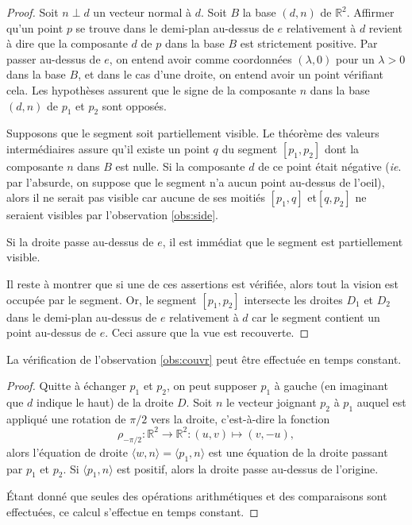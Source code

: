 \begin{proof}
  Soit $n\perp d$ un vecteur normal à $d$. Soit $B$ la base $(d, n)$
  de $\mathbb R^2$. Affirmer qu'un point $p$ se trouve
  dans le demi-plan au-dessus de $e$ relativement à $d$ revient à dire
  que la composante $d$ de $p$ dans la base $B$ est strictement
  positive. Par passer au-dessus de $e$, on entend avoir comme coordonnées
  $(\lambda, 0)$ pour un $\lambda >0$ dans la base $B$, et dans le cas d'une
  droite, on entend avoir un point vérifiant cela.
  Les hypothèses assurent que le signe de la composante $n$ dans la base
  $(d, n)$ de $p_1$ et $p_2$ sont opposés.

  Supposons que le segment soit partiellement visible. Le théorème
  des valeurs intermédiaires assure qu'il existe un point $q$ du segment
  $[p_1, p_2]$ dont la composante $n$ dans $B$ est nulle. Si la
  composante $d$ de ce point était négative (\emph{ie}. par l'absurde,
  on suppose que le segment n'a aucun point au-dessus de l'oeil),
  alors il ne serait pas visible car aucune de ses moitiés $[p_1, q]$
  et$[q, p_2]$ ne seraient visibles par l'observation \ref{obs:side}.

  Si la droite passe au-dessus de $e$, il est immédiat que le segment
  est partiellement visible.

  Il reste à montrer que si une de ces assertions est vérifiée, alors
  tout la vision est occupée par le segment. Or, le segment
  $[p_1, p_2]$ intersecte les droites $D_1$ et $D_2$ dans le demi-plan
  au-dessus de $e$ relativement à $d$ car le segment contient un point
  au-dessus de $e$. Ceci assure que la vue est recouverte.
\end{proof}
\begin{lem}\label{lem:couvr}
  La vérification de l'observation \ref{obs:couvr} peut être effectuée en
  temps constant.
\end{lem}
\begin{proof}
  Quitte à échanger $p_1$ et $p_2$, on peut supposer $p_1$ à gauche
  (en imaginant que $d$ indique le haut) de la droite $D$.
  Soit $n$ le vecteur joignant $p_2$ à $p_1$ auquel est appliqué
  une rotation de $\pi/2$ vers la droite, c'est-à-dire la fonction
  $$ \rho_{-\pi/2}:\mathbb R^2\to\mathbb R^2: (u, v)\mapsto (v, -u),$$
  alors l'équation de droite $\langle w, n\rangle = \langle p_1, n\rangle$
  est une équation de la droite passant par $p_1$ et $p_2$.
  Si $\langle p_1, n\rangle$ est positif, alors la droite passe au-dessus
  de l'origine.

  \'Etant donné que seules des opérations arithmétiques et des comparaisons
  sont effectuées, ce calcul s'effectue en temps constant.
\end{proof}

